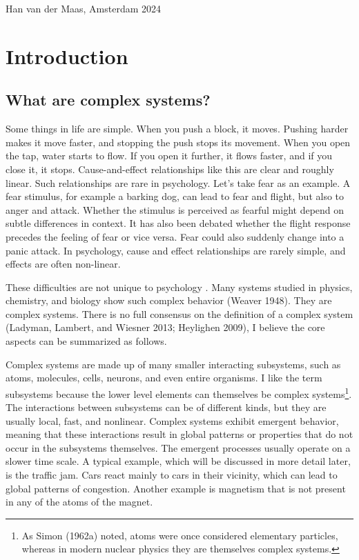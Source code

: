 \documentclass[
  a4paper,
  DIV=11,
  numbers=noendperiod]{scrreprt}
\begin{document}
Han van der Maas, Amsterdam 2024


\hypertarget{sec-ch1}{%
\chapter{Introduction}\label{sec-ch1}}

\hypertarget{sec-What-are-complex-systems-secWhat}{%
\section{What are complex
systems?}\label{sec-What-are-complex-systems-secWhat}}

Some things in life are simple. When you push a block, it moves. Pushing
harder makes it move faster, and stopping the push stops its movement.
When you open the tap, water starts to flow. If you open it further, it
flows faster, and if you close it, it stops. Cause-and-effect
relationships like this are clear and roughly linear. Such relationships
are rare in psychology. Let's take fear as an example. A fear stimulus,
for example a barking dog, can lead to fear and flight, but also to
anger and attack. Whether the stimulus is perceived as fearful might
depend on subtle differences in context. It has also been debated
whether the flight response precedes the feeling of fear or vice versa.
Fear could also suddenly change into a panic attack. In psychology,
cause and effect relationships are rarely simple, and effects are often
non-linear.

These difficulties are not unique to psychology . Many systems studied
in physics, chemistry, and biology show such complex behavior (Weaver
1948). They are complex systems. There is no full consensus on the
definition of a complex system (Ladyman, Lambert, and Wiesner 2013;
Heylighen 2009), I believe the core aspects can be summarized as
follows.

Complex systems are made up of many smaller interacting subsystems, such
as atoms, molecules, cells, neurons, and even entire organisms. I like
the term subsystems because the lower level elements can themselves be
complex systems\footnote{As Simon (1962a) noted, atoms were once
  considered elementary particles, whereas in modern nuclear physics
  they are themselves complex systems.}. The interactions between
subsystems can be of different kinds, but they are usually local, fast,
and nonlinear. Complex systems exhibit emergent behavior, meaning that
these interactions result in global patterns or properties that do not
occur in the subsystems themselves. The emergent processes usually
operate on a slower time scale. A typical example, which will be
discussed in more detail later, is the traffic jam. Cars react mainly to
cars in their vicinity, which can lead to global patterns of congestion.
Another example is magnetism that is not present in any of the atoms of
the magnet.
\end{document}

